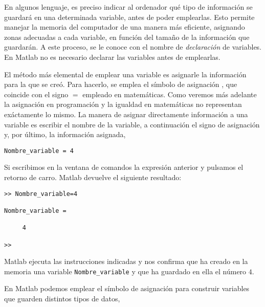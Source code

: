  En algunos lenguaje, es preciso indicar al ordenador qué tipo de información se guardará en una determinada variable, antes de poder emplearlas. Esto permite manejar la memoria del computador de una manera más eficiente, asignando zonas adecuadas a cada variable, en función del tamaño de la información que guardarán. A este proceso, se le conoce con el nombre de \emph{declaración} de variables. En Matlab no es necesario declarar las variables antes de emplearlas.

El método más elemental de emplear una variable es asignarle la información para la que se creó. Para hacerlo, se emplea el símbolo de asignación  , que coincide con el signo $=$ empleado en matemáticas. Como veremos más adelante la asignación en programación y la igualdad en matemáticas no representan exáctamente lo mismo. La manera de asignar directamente información a una variable es escribir el nombre de la variable, a continuación  el signo de asignación y, por último, la información asignada,
\begin{verbatim}
Nombre_variable = 4
\end{verbatim}  

Si escribimos en la ventana de comandos la expresión anterior y pulsamos el retorno de carro. Matlab devuelve el siguiente resultado:

\begin{verbatim}
>> Nombre_variable=4

Nombre_variable =

     4

>> 
\end{verbatim}  
Matlab ejecuta las instrucciones indicadas y nos confirma que ha creado en la memoria una variable \texttt{Nombre\_variable} y que ha guardado en  ella el número $4$. 

En Matlab podemos emplear el símbolo de asignación para construir variables que guarden distintos tipos de datos,


